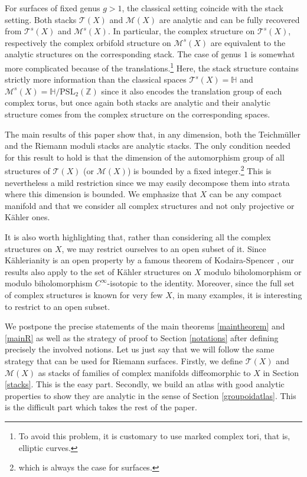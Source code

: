 \documentclass[JEP,XML,SOM,Unicode]{cedram}
\let\mathcal\mathscr
\newcommand{\PSL}{\mathrm{PSL}}
\theoremstyle{plain}
\theoremstyle{definition}
\theoremstyle{remark}
\numberwithin{equation}{section}
\newcommand{\T}{\mathcal T(X)}
\begin{document}
For surfaces of fixed genus $g>1$, the classical setting coincide with the stack setting. Both stacks $\T$ and $\mathcal M(X)$ are analytic and can be fully recovered from $\mathcal T^s(X)$ and $\mathcal M^s(X)$. In particular, the complex structure on $\mathcal T^s(X)$, respectively the complex orbifold structure on $\mathcal M^s(X)$ are equivalent to the analytic structures on the corresponding stack. The case of genus $1$ is somewhat more complicated because of the translations.\footnote{To avoid this problem, it is customary to use marked complex tori, that is, elliptic curves.} Here, the stack structure contains strictly more information than the classical spaces $\mathcal T^s(X)=\mathbb H$ and $\mathcal M^s(X)=\mathbb H/\PSL_2(\mathbb Z)$ since it also encodes the translation group of each complex torus, but once again both stacks are analytic and their analytic structure comes from the complex structure on the corresponding spaces.

The main results of this paper show that, in any dimension, both the Teichmüller and the Riemann moduli stacks are analytic stacks. The only condition needed for this result to hold is that the dimension of the automorphism group of all structures of $\mathcal T(X)$ (or $\mathcal M(X)$) is bounded by a fixed integer.\footnote{which is always the case for surfaces.} This is nevertheless a mild restriction since we may easily decompose them into strata where this dimension is bounded. We emphasize that $X$ can be any compact manifold and that we consider all complex structures and not only projective or Kähler ones.

It is also worth highlighting that, rather than considering all the complex structures on $X$, we may restrict ourselves to an open subset of it. Since Kählerianity is an open property by a famous theorem of Kodaira-Spencer \cite[Th.\,4.6]{MK}, our results also apply to the set of Kähler structures on $X$ modulo biholomorphism or modulo biholomorphism $C^\infty$-isotopic to the identity. Moreover, since the full set of complex structures is known for very few $X$, in many examples, it is interesting to restrict to an open subset.

We postpone the precise statements of the main theorems \ref{maintheorem} and \ref{mainR} as well as the strategy of proof to Section \ref{notations} after defining precisely the involved notions. Let us just say that we will follow the same strategy that can be used for Riemann surfaces. Firstly, we define $\mathcal T(X)$ and $\mathcal M(X)$ as stacks of families of complex manifolds diffeomorphic to $X$ in Section \ref{stacks}. This is the easy part. Secondly, we build an atlas with good analytic properties to show they are analytic in the sense of Section \ref{groupoidatlas}. This is the difficult part which takes the rest of the paper.
\end{document}
